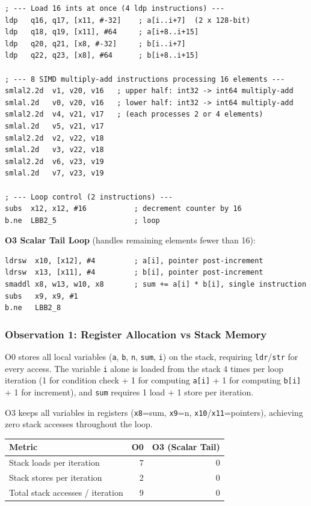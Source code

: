 \documentclass[12pt,a4paper]{article}
\begin{document}
\begin{lstlisting}
; --- Load 16 ints at once (4 ldp instructions) ---
ldp   q16, q17, [x11, #-32]    ; a[i..i+7]  (2 x 128-bit)
ldp   q18, q19, [x11], #64     ; a[i+8..i+15]
ldp   q20, q21, [x8, #-32]     ; b[i..i+7]
ldp   q22, q23, [x8], #64      ; b[i+8..i+15]

; --- 8 SIMD multiply-add instructions processing 16 elements ---
smlal2.2d  v1, v20, v16   ; upper half: int32 -> int64 multiply-add
smlal.2d   v0, v20, v16   ; lower half: int32 -> int64 multiply-add
smlal2.2d  v4, v21, v17   ; (each processes 2 or 4 elements)
smlal.2d   v5, v21, v17
smlal2.2d  v2, v22, v18
smlal.2d   v3, v22, v18
smlal2.2d  v6, v23, v19
smlal.2d   v7, v23, v19

; --- Loop control (2 instructions) ---
subs  x12, x12, #16           ; decrement counter by 16
b.ne  LBB2_5                  ; loop
\end{lstlisting}

\textbf{O3 Scalar Tail Loop} (handles remaining elements fewer than 16):

\begin{lstlisting}
ldrsw  x10, [x12], #4         ; a[i], pointer post-increment
ldrsw  x13, [x11], #4         ; b[i], pointer post-increment
smaddl x8, w13, w10, x8       ; sum += a[i] * b[i], single instruction
subs   x9, x9, #1
b.ne   LBB2_8
\end{lstlisting}

\subsubsection{Observation 1: Register Allocation vs Stack Memory}

O0 stores all local variables (\texttt{a}, \texttt{b}, \texttt{n}, \texttt{sum}, \texttt{i}) on the stack, requiring \texttt{ldr}/\texttt{str} for every access. The variable \texttt{i} alone is loaded from the stack 4 times per loop iteration (1 for condition check + 1 for computing \texttt{a[i]} + 1 for computing \texttt{b[i]} + 1 for increment), and \texttt{sum} requires 1 load + 1 store per iteration.

O3 keeps all variables in registers (\texttt{x8}=sum, \texttt{x9}=n, \texttt{x10}/\texttt{x11}=pointers), achieving zero stack accesses throughout the loop.

\begin{table}[H]
\centering
\begin{tabular}{l r r}
\toprule
Metric & O0 & O3 (Scalar Tail) \\
\midrule
Stack loads per iteration & 7 & 0 \\
Stack stores per iteration & 2 & 0 \\
Total stack accesses / iteration & 9 & 0 \\
\bottomrule
\end{tabular}
\end{table}
\end{document}
